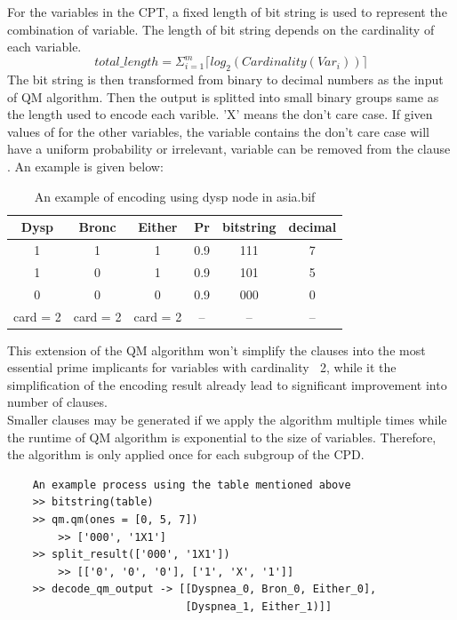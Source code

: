     For the variables in the CPT, a fixed length of bit string is used to represent the combination of variable. The length of bit string depends on the cardinality of each variable. 
    $$total\_length = \Sigma_{i = 1}^{m} \lceil log_{2}(Cardinality(Var_{i}))\rceil$$
    The bit string is then transformed from binary to decimal numbers as the input of QM algorithm. Then the output is splitted into small binary groups same as the length used to encode each varible. 'X' means the don't care case. If given values of for the other variables, the variable contains the don't care case will have a uniform probability or irrelevant, variable can be removed from the clause . An example is given below:\\
    
    \begin{table}[]
        \centering
        \begin{tabular}{c c c c |c c}
            \hline
            Dysp & Bronc & Either & Pr & bitstring & decimal \\
            \hline
            \hline
             1 & 1 & 1 & 0.9 & 111 & 7 \\
             1 & 0 & 1 & 0.9 & 101 & 5 \\
             0 & 0 & 0 & 0.9 & 000 & 0 \\
            \hline
            card = 2 & card = 2 & card = 2 & -- & -- & -- \\
            \hline
        \end{tabular}
        \caption{An example of encoding using dysp node in asia.bif}
        \label{tab:my_label}
    \end{table}
    
    This extension of the QM algorithm won't simplify the clauses into the most essential prime implicants for variables with cardinality $\>$ 2, while it the simplification of the encoding result already lead to significant improvement into number of clauses.\\
    
    Smaller clauses may be generated if we apply the algorithm multiple times while the runtime of QM algorithm is exponential to the size of variables. Therefore, the algorithm is only applied once for each subgroup of the CPD.\\
    
    \begin{lstlisting}
    An example process using the table mentioned above
    >> bitstring(table)
    >> qm.qm(ones = [0, 5, 7])
        >> ['000', '1X1']
    >> split_result(['000', '1X1'])
        >> [['0', '0', '0'], ['1', 'X', '1']]
    >> decode_qm_output -> [[Dyspnea_0, Bron_0, Either_0],
                            [Dyspnea_1, Either_1)]]
    \end{lstlisting}
    
